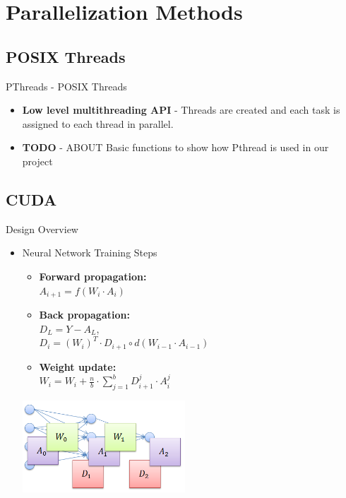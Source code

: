 \section{Parallelization Methods}
    \subsection{POSIX Threads}
        \begin{frame}{PThreads - POSIX Threads}
            \begin{itemize}
                \item {
                    \textbf{Low level multithreading API} - Threads are created and each task is assigned to each thread in parallel.
                    }
                \item {
                    \textbf{TODO} - ABOUT Basic functions to show how Pthread is used in our project
                    }
            \end{itemize}
        \end{frame}
        

\subsection{CUDA}
\begin{frame}{Design Overview}

\begin{itemize}

\item{ Neural Network Training Steps }
\begin{itemize}
\item{\textbf{Forward propagation:}  \\$A_{i+1} = f(W_{i} \cdot A_{i})$}
\item{\textbf{Back propagation:}  \\$D_L =Y - A_L$,\\ $D_i = (W_{i})^{T}\cdot D_{i+1} \circ d(W_{i-1} \cdot A_{i-1})$}
\item{\textbf{Weight update:} \\$W_{i} = W_{i} + \frac{n}{b} \cdot \sum_{j=1}^{b} D_{i+1}^{j} \cdot A_{i}^j$}
\end{itemize}

\begin{center}
\includegraphics[width=2.4in]{gpu_neural_net_data.png}
\end{center}

\end{itemize}

\end{frame}

